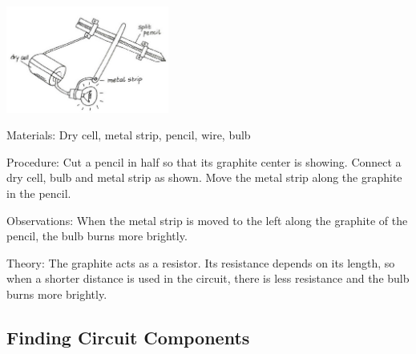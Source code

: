 \begin{multicols}{2}
\begin{center}
\includegraphics[width=0.4\textwidth]{./img/vso/rheostat.png}
\end{center}

\begin{description*}
\item[Materials:]{Dry cell, metal strip, pencil, wire, bulb}
\item[Procedure:]{Cut a pencil in half so that its graphite center is showing. Connect a dry cell, bulb and metal strip as shown. Move the metal strip along the graphite in the pencil.}
\item[Observations:]{When the metal strip is moved to the left along the graphite of the pencil, the bulb burns more brightly.}
\item[Theory:]{The graphite acts as a resistor. Its resistance depends on its length, so when a shorter distance is used in the circuit, there is less resistance and the bulb burns more brightly.}
\end{description*}

\subsection{Finding Circuit Components}



\end{multicols}

